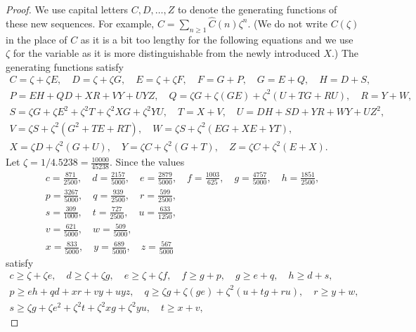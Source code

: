 \documentclass[a4paper,12pt]{article}
\begin{document}
\begin{proof}
	We use capital letters $C,D,\dots,Z$ to denote the generating functions of these new sequences. For example, $C = \sum_{n\ge 1} \hat{C}(n)\zeta^n$. (We do not write $C(\zeta)$ in the place of $C$ as it is a bit too lengthy for the following equations and we use $\zeta$ for the variable as it is more distinguishable from the newly introduced $X$.) The generating functions satisfy
    {\small
	\begin{gather*}
		C = \zeta + \zeta E,\quad D = \zeta + \zeta G,\quad E = \zeta + \zeta F,\quad F = G + P,\quad G = E + Q,\quad H = D + S,\\
		P = E H + Q D + X R + V Y + U Y Z,\quad Q = \zeta G + \zeta(G E) + \zeta^{2}(U + T G + R U),\quad R = Y + W,\\
		S = \zeta G + \zeta E^{2} + \zeta^{2} T + \zeta^{2} X G + \zeta^{2} Y U,\quad T = X + V,\quad U = D H + S D + Y R + W Y + U Z^{2},\\
		V = \zeta S + \zeta^{2}(G^{2} + T E + R T),\quad W = \zeta S + \zeta^{2}(E G + X E + Y T),\\
		X = \zeta D + \zeta^{2}(G + U),\quad Y = \zeta C + \zeta^{2}(G + T),\quad Z = \zeta C + \zeta^{2}(E + X).
	\end{gather*}
    }
	Let $\zeta=1/4.5238=\frac{10000}{45238}$.
	Since the values
	\begin{gather*}
		c = \tfrac{871}{2500},\quad
		d = \tfrac{2157}{5000},\quad
		e = \tfrac{2879}{5000},\quad
		f = \tfrac{1003}{625},\quad
		g = \tfrac{4757}{5000},\quad
		h = \tfrac{1851}{2500},\\
		p = \tfrac{3267}{5000},\quad
		q = \tfrac{939}{2500},\quad
		r = \tfrac{599}{2500},\\
		s = \tfrac{309}{1000},\quad
		t = \tfrac{727}{2500},\quad
		u = \tfrac{633}{1250},\\
		v = \tfrac{621}{5000},\quad
		w = \tfrac{509}{5000},\\
		x = \tfrac{833}{5000},\quad
		y = \tfrac{689}{5000},\quad
		z = \tfrac{567}{5000}
	\end{gather*}
	satisfy
	\begin{gather*}
		c \ge \zeta + \zeta e,\quad 
		d \ge \zeta + \zeta g,\quad 
		e \ge \zeta + \zeta f,\quad 
		f \ge g + p,\quad 
		g \ge e + q,\quad 
		h \ge d + s,\\
		p \ge e h + q d + x r + v y + u y z,\quad 
		q \ge \zeta g + \zeta(g e) + \zeta^{2}(u + t g + r u),\quad 
		r \ge y + w,\\
		s \ge \zeta g + \zeta e^{2} + \zeta^{2} t + \zeta^{2} x g + \zeta^{2} y u,\quad 
		t \ge x + v,\quad 

\end{gather*}
\end{proof}
\end{document}
